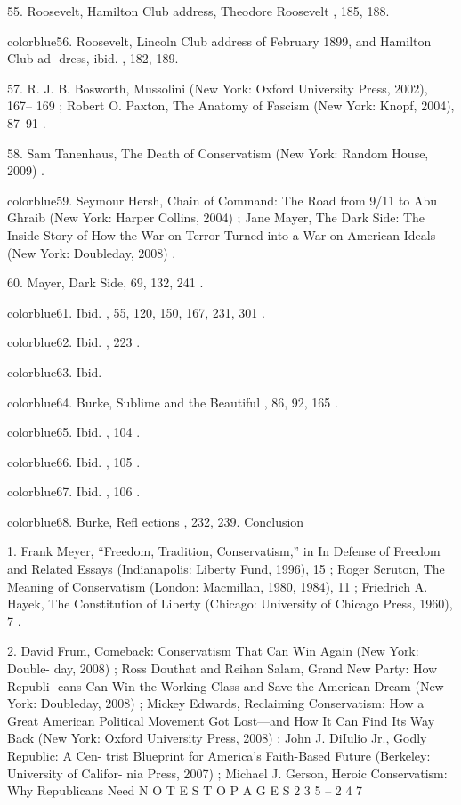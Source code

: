 	{\color{blue}55}. Roosevelt, Hamilton Club address, Theodore Roosevelt , 185, 188.


	{color{blue}56}. Roosevelt, Lincoln Club address of February 1899, and Hamilton Club ad- dress, ibid. , 182, 189.


	{\color{blue}57}. R. J. B. Bosworth, Mussolini (New York: Oxford University Press, 2002), 167– 169 ; Robert O. Paxton, The Anatomy of Fascism (New York: Knopf, 2004), 87–91 .


	{\color{blue}58}. Sam Tanenhaus, The Death of Conservatism (New York: Random House, 2009) .


	{color{blue}59}. Seymour Hersh, Chain of Command: The Road from 9/11 to Abu Ghraib (New York: Harper Collins, 2004) ; Jane Mayer, The Dark Side: The Inside Story of How the War on Terror Turned into a War on American Ideals (New York: Doubleday, 2008) .


	{\color{blue}60}. Mayer, Dark Side, 69, 132, 241 .


	{color{blue}61}. Ibid. , 55, 120, 150, 167, 231, 301 .


	{color{blue}62}. Ibid. , 223 .


	{color{blue}63}. Ibid.


	{color{blue}64}. Burke, Sublime and the Beautiful , 86, 92, 165 .


	{color{blue}65}. Ibid. , 104 .


	{color{blue}66}. Ibid. , 105 .


	{color{blue}67}. Ibid. , 106 .


	{color{blue}68}. Burke, Refl ections , 232, 239. Conclusion


	{\color{blue}1}. Frank Meyer, “Freedom, Tradition, Conservatism,” in In Defense of Freedom and Related Essays (Indianapolis: Liberty Fund, 1996), 15 ; Roger Scruton, The Meaning of Conservatism (London: Macmillan, 1980, 1984), 11 ; Friedrich A. Hayek, The Constitution of Liberty (Chicago: University of Chicago Press, 1960), 7 .


	{\color{blue}2}. David Frum, Comeback: Conservatism That Can Win Again (New York: Double- day, 2008) ; Ross Douthat and Reihan Salam, Grand New Party: How Republi- cans Can Win the Working Class and Save the American Dream (New York: Doubleday, 2008) ; Mickey Edwards, Reclaiming Conservatism: How a Great American Political Movement Got Lost—and How It Can Find Its Way Back (New York: Oxford University Press, 2008) ; John J. DiIulio Jr., Godly Republic: A Cen- trist Blueprint for America’s Faith-Based Future (Berkeley: University of Califor- nia Press, 2007) ; Michael J. Gerson, Heroic Conservatism: Why Republicans Need N O T E S T O P A G E S 2 3 5 – 2 4 7


